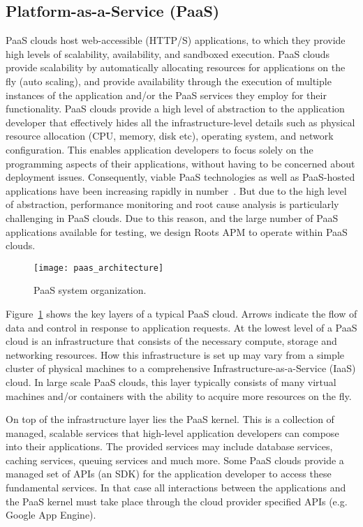 \subsection{Platform-as-a-Service (PaaS)}

PaaS clouds host web-accessible (HTTP/S) applications, to which they provide
high levels of scalability, availability, and sandboxed execution.  PaaS
clouds provide scalability by automatically allocating resources for
applications on the fly (auto scaling), and provide availability through the
execution of multiple instances of the application and/or the PaaS services
they employ for their functionality.  PaaS clouds provide a high level of
abstraction to the application developer that effectively hides all the
infra\-structure-level details such as physical resource allocation (CPU,
memory, disk etc), operating system, and network configuration. This enables
application developers to focus solely on the programming aspects of their
applications, without having to be concerned about deployment issues.
Consequently, viable PaaS technologies as well as PaaS-hosted applications
have been increasing rapidly in number~\cite{paas-growth,paas-growth2}.  But
due to the high level of abstraction, performance monitoring and root cause
analysis is particularly challenging in PaaS clouds. Due to this reason, and
the large number of PaaS applications available for testing, we design Roots
APM to operate within PaaS clouds.

\begin{figure}
\centering
\texttt{[image: paas\_architecture]}
\caption{PaaS system organization.}
\label{fig:paas_architecture}
\end{figure}

Figure~\ref{fig:paas_architecture} shows the key layers of a typical PaaS cloud. Arrows indicate
the flow of data and control in response to application requests.
At the lowest level of a PaaS cloud is an infrastructure that consists of the necessary compute, storage
and networking resources. How this infrastructure is set up may vary from a simple cluster of physical 
machines to a comprehensive Infrastructure-as-a-Service (IaaS) cloud. In large scale PaaS clouds,
this layer typically consists of many virtual machines and/or containers with the ability to acquire more
resources on the fly.

On top of the infrastructure layer lies the PaaS kernel. This is a collection of managed, scalable
services that high-level application developers can compose into their applications. The provided services
may include database services, caching services, queuing services and much more. Some PaaS clouds
provide a managed set of APIs (an SDK) for the application developer to access these fundamental services. 
In that case all interactions between the applications and the PaaS kernel must take place through
the cloud provider specified APIs (e.g. Google App Engine). 


